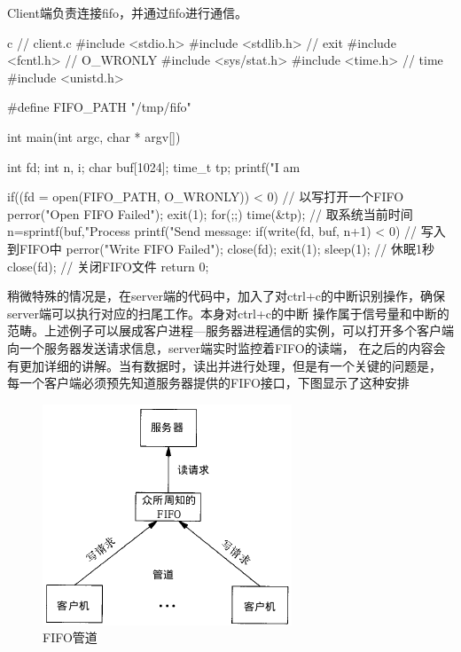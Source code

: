Client端负责连接fifo，并通过fifo进行通信。
\begin{code-block}{c}
// client.c
#include <stdio.h>
#include <stdlib.h>   // exit
#include <fcntl.h>    // O_WRONLY
#include <sys/stat.h>
#include <time.h>     // time
#include <unistd.h>

#define FIFO_PATH "/tmp/fifo"

int main(int argc, char * argv[])
{
        int fd;
        int n, i;
        char buf[1024];
        time_t tp;
        printf("I am %

        if((fd = open(FIFO_PATH, O_WRONLY)) < 0) // 以写打开一个FIFO
        {
                perror("Open FIFO Failed");
                exit(1);
        }
        for(;;)
        {
                time(&tp);  // 取系统当前时间
                n=sprintf(buf,"Process %
                printf("Send message: %
                if(write(fd, buf, n+1) < 0)  // 写入到FIFO中
                {
                        perror("Write FIFO Failed");
                        close(fd);
                        exit(1);
                }
                sleep(1);  // 休眠1秒
        }
        close(fd);  // 关闭FIFO文件
        return 0;
}
\end{code-block}

稍微特殊的情况是，在server端的代码中，加入了对ctrl+c的中断识别操作，确保server端可以执行对应的扫尾工作。本身对ctrl+c的中断
操作属于信号量和中断的范畴。上述例子可以展成客户进程—服务器进程通信的实例，可以打开多个客户端
向一个服务器发送请求信息，server端实时监控着FIFO的读端，
在之后的内容会有更加详细的讲解。当有数据时，读出并进行处理，但是有一个关键的问题是，
每一个客户端必须预先知道服务器提供的FIFO接口，下图显示了这种安排
\begin{figure}[H]
  \centering
  \includegraphics[width=\linewidth]{fifo.png}
  \caption{FIFO管道}
  \label{fig:fifo}
\end{figure}

